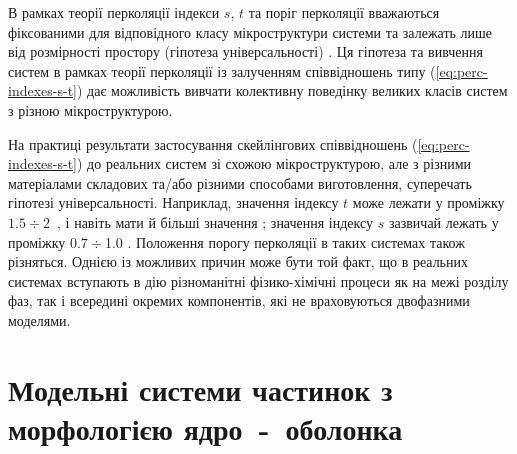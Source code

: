 \documentclass[14pt,twoside]{vakthesis}
\begin{document}
В рамках теорії перколяції індекси $s$, $t$ та поріг перколяції вважаються фіксованими для відповідного класу мікроструктури системи та залежать лише від розмірності простору (гіпотеза універсальності) \cite{Aharony,Torquato,Hunt}. 
Ця гіпотеза та вивчення систем в рамках теорії перколяції із залученням співвідношень типу (\ref{eq:perc-indexes-s-t}) дає можливість вивчати колективну поведінку великих класів  систем з різною мікроструктурою. 

На практиці результати застосування  скейлінгових співвідношень (\ref{eq:perc-indexes-s-t}) до реальних систем зі схожою мікроструктурою, але з різними матеріалами складових та/або різними способами виготовлення, суперечать гіпотезі універсальності. Наприклад, значення індексу $t$ може лежати у проміжку $1.5\div 2$~\cite{Nan1993}, і навіть мати й більші значення \cite{Balberg1987,Nan1993}; значення індексу $s$ зазвичай лежать у проміжку $0.7 \div$1.0 \cite{Nan1993}.
Положення порогу перколяції в таких системах також різняться. 
Однією із можливих причин може бути той факт, що в реальних системах вступають в дію різноманітні фізико-хімічні процеси як на межі розділу фаз, так і всередині окремих компонентів, які не враховуються двофазними моделями. 


\section{Модельні системи частинок з морфологією ядро~-~оболонка}\label{sec:core-shell-intro}
\end{document}
